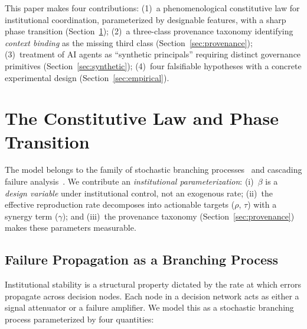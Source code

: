 \documentclass[runningheads]{llncs}
\begin{document}
This paper makes four contributions: (1)~a phenomenological constitutive law for institutional coordination, parameterized by designable features, with a sharp phase transition (Section~\ref{sec:constitutive}); (2)~a three-class provenance taxonomy identifying \emph{context binding} as the missing third class (Section~\ref{sec:provenance}); (3)~treatment of AI agents as ``synthetic principals'' requiring distinct governance primitives (Section~\ref{sec:synthetic}); (4)~four falsifiable hypotheses with a concrete experimental design (Section~\ref{sec:empirical}).


\section{The Constitutive Law and Phase Transition}
\label{sec:constitutive}

The model belongs to the family of stochastic branching processes~\cite{anderson1991infectious,hethcote2000mathematics} and cascading failure analysis~\cite{watts2002simple,buldyrev2010catastrophic,dobson2024cascading}. We contribute an \emph{institutional parameterization}: (i)~$\beta$ is a \emph{design variable} under institutional control, not an exogenous rate; (ii)~the effective reproduction rate decomposes into actionable targets ($\rho$, $\tau$) with a synergy term ($\gamma$); and (iii)~the provenance taxonomy (Section~\ref{sec:provenance}) makes these parameters measurable.

\subsection{Failure Propagation as a Branching Process}

Institutional stability is a structural property dictated by the rate at which errors propagate across decision nodes. Each node in a decision network acts as either a signal attenuator or a failure amplifier. We model this as a stochastic branching process parameterized by four quantities:
\end{document}
